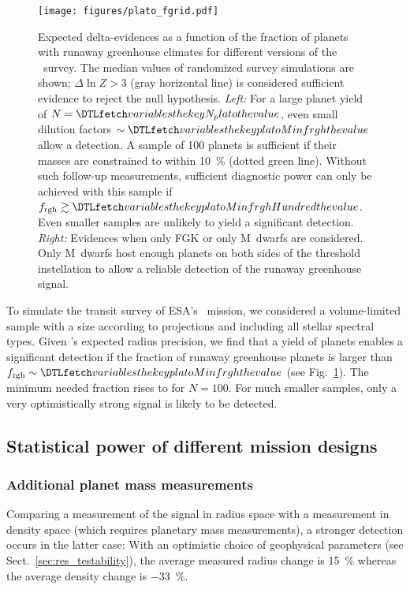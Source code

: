 \documentclass[twocolumn,twocolappendix]{aastex631}
\begin{document}
    \begin{figure*}[ht!]
        \begin{centering}
            \texttt{[image: figures/plato\_fgrid.pdf]}
            \caption{
            Expected delta-evidences as a function of the fraction of planets with runaway greenhouse climates for different versions of the \plato\ survey.
            The median values of randomized survey simulations are shown; $\Delta \ln Z > 3$ (gray horizontal line) is considered sufficient evidence to reject the null hypothesis.
            \textit{Left:} For a large planet yield of $N = \var{N_plato}$, even small dilution factors $\sim \var{platoMinfrgh}$ allow a detection.
                A sample of 100 planets is sufficient if their masses are constrained to within \SI{10}{\percent} (dotted green line).
                Without such follow-up measurements, sufficient diagnostic power can only be achieved with this sample if $f_\mathrm{rgh} \gtrsim \var{platoMinfrghHundred}$.
               Even smaller samples are unlikely to yield a significant detection.
            \textit{Right:} Evidences when only FGK or only M~dwarfs are considered.
                Only M~dwarfs host enough planets on both sides of the threshold instellation to allow a reliable detection of the runaway greenhouse signal.
            }
            \label{fig:plato_fgrid}
        \end{centering}
    \end{figure*}
To simulate the transit survey of ESA's \plato\ mission, we considered a volume-limited sample with a size according to projections and including all stellar spectral types.
Given \plato's expected radius precision, we find that a yield of  planets enables a significant detection if the fraction of runaway greenhouse planets is larger than $ f_\mathrm{rgh} \sim \var{platoMinfrgh}$ (see Fig.~\ref{fig:plato_fgrid}).
The minimum needed fraction rises to  for $N = 100$.
For much smaller samples, only a very optimistically strong signal is likely to be detected.


\subsection{Statistical power of different mission designs}\label{sec:statpower_missions}

\subsubsection{Additional planet mass measurements}\label{sec:res_followup}
Comparing a measurement of the signal in radius space with a measurement in density space (which requires planetary mass measurements), a stronger detection occurs in the latter case:
With an optimistic choice of geophysical parameters (see Sect.~\ref{sec:res_testability}), the average measured radius change is \SI{+15}{\percent} whereas the average density change is \SI{-33}{\percent}.
\end{document}
